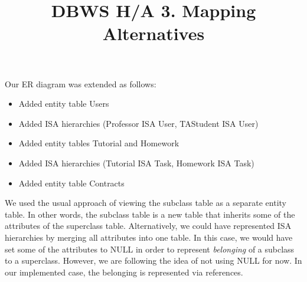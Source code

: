 \documentclass[]{article}
\title{DBWS H/A 3. Mapping Alternatives}
\begin{document}
	
\maketitle

Our ER diagram was extended as follows:

\begin{itemize}
	\item Added entity table Users
	\item Added ISA hierarchies (Professor ISA User, TAStudent ISA User)
	\item Added entity tables Tutorial and Homework
	\item Added ISA hierarchies (Tutorial ISA Task, Homework ISA Task)
	\item Added entity table Contracts
\end{itemize}

We used the usual approach of viewing the subclass table as a separate entity table. In other words, the subclass table is a new table that inherits some of the attributes of the superclass table. Alternatively, we could have represented ISA hierarchies by merging all attributes into one table. In this case, we would have set some of the attributes to NULL in order to represent \textit{belonging} of a subclass to a superclass. However, we are following the idea of not using NULL for now. In our implemented case, the belonging is represented via references.
	
	
\end{document}

